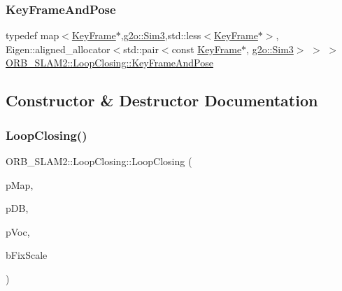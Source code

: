 \subsubsection{\texorpdfstring{Key\+Frame\+And\+Pose}{KeyFrameAndPose}}
{\footnotesize\ttfamily typedef map$<$\mbox{\hyperlink{class_o_r_b___s_l_a_m2_1_1_key_frame}{Key\+Frame}}$\ast$,\mbox{\hyperlink{structg2o_1_1_sim3}{g2o\+::\+Sim3}},std\+::less$<$\mbox{\hyperlink{class_o_r_b___s_l_a_m2_1_1_key_frame}{Key\+Frame}}$\ast$$>$, Eigen\+::aligned\+\_\+allocator$<$std\+::pair$<$const \mbox{\hyperlink{class_o_r_b___s_l_a_m2_1_1_key_frame}{Key\+Frame}}$\ast$, \mbox{\hyperlink{structg2o_1_1_sim3}{g2o\+::\+Sim3}}$>$ $>$ $>$ \mbox{\hyperlink{class_o_r_b___s_l_a_m2_1_1_loop_closing_ae9ada143a8308ce32990a7c7b5d533ab}{O\+R\+B\+\_\+\+S\+L\+A\+M2\+::\+Loop\+Closing\+::\+Key\+Frame\+And\+Pose}}}



\subsection{Constructor \& Destructor Documentation}
\mbox{\label{class_o_r_b___s_l_a_m2_1_1_loop_closing_af5f7b8a43efa8bc771a5227ed2fbf460}} 
\subsubsection{\texorpdfstring{Loop\+Closing()}{LoopClosing()}}
{\footnotesize\ttfamily O\+R\+B\+\_\+\+S\+L\+A\+M2\+::\+Loop\+Closing\+::\+Loop\+Closing (\begin{DoxyParamCaption}\item[{\mbox{\hyperlink{class_o_r_b___s_l_a_m2_1_1_map}{Map}} $\ast$}]{p\+Map,  }\item[{\mbox{\hyperlink{class_o_r_b___s_l_a_m2_1_1_key_frame_database}{Key\+Frame\+Database}} $\ast$}]{p\+DB,  }\item[{\mbox{\hyperlink{namespace_o_r_b___s_l_a_m2_a2fafba714858cab1bb18d438e2e83c5d}{O\+R\+B\+Vocabulary}} $\ast$}]{p\+Voc,  }\item[{const bool}]{b\+Fix\+Scale }\end{DoxyParamCaption})}



